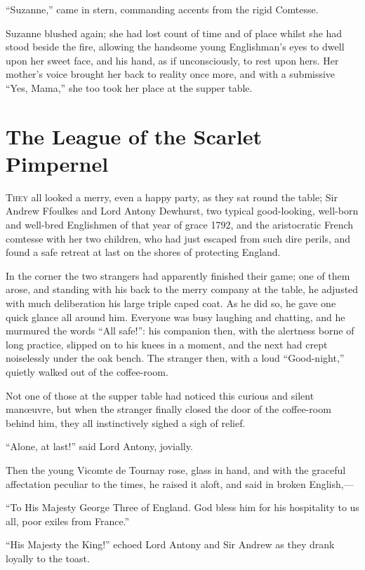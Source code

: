 \documentclass[paper=a5,BCOR=7mm,twoside,DIV=calc,12pt,usegeometry,chapterprefix,endperiod,headings=big]{scrbook}
\begin{document}
\enquote{Suzanne,} came in stern, commanding accents from the rigid Comtesse.

Suzanne blushed again; she had lost count of time and of place whilst she had stood beside the fire, allowing the handsome young Englishman's eyes to dwell upon her sweet face, and his hand, as if unconsciously, to rest upon hers. Her mother's voice brought her back to reality once more, and with a submissive \enquote{Yes, Mama,} she too took her place at the supper table.

\chapter{The League of the Scarlet Pimpernel}

\lettrine[lines=4]{T}{hey} all looked a merry, even a happy party, as they sat round the table; Sir Andrew Ffoulkes and Lord Antony Dewhurst, two typical good-looking, well-born and well-bred Englishmen of that year of grace 1792, and the aristocratic French comtesse with her two children, who had just escaped from such dire perils, and found a safe retreat at last on the shores of protecting England.

In the corner the two strangers had apparently finished their game; one of them arose, and standing with his back to the merry company at the table, he adjusted with much deliberation his large triple caped coat. As he did so, he gave one quick glance all around him. Everyone was busy laughing and chatting, and he murmured the words \enquote{All safe!}: his companion then, with the alertness borne of long practice, slipped on to his knees in a moment, and the next had crept noiselessly under the oak bench. The stranger then, with a loud \enquote{Good-night,} quietly walked out of the coffee-room.

Not one of those at the supper table had noticed this curious and silent manœuvre, but when the stranger finally closed the door of the coffee-room behind him, they all instinctively sighed a sigh of relief.

\enquote{Alone, at last!} said Lord Antony, jovially.

Then the young Vicomte de Tournay rose, glass in hand, and with the graceful affectation peculiar to the times, he raised it aloft, and said in broken English,---

\enquote{To His Majesty George Three of England. God bless him for his hospitality to us all, poor exiles from France.}

\enquote{His Majesty the King!} echoed Lord Antony and Sir Andrew as they drank loyally to the toast.
\end{document}
